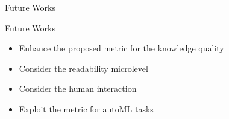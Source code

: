 \documentclass{beamer}
\begin{document}
\begin{frame}[c]{Future Works}
	\vfill
	\begin{block}{Future Works}
		\medskip
		\begin{itemize}
			\item Enhance the proposed metric for the knowledge quality
			\medskip
			\item Consider the readability microlevel
			\medskip
			\item Consider the human interaction
			\medskip
			\item Exploit the metric for autoML tasks
		\end{itemize}
		\medskip
	\end{block}
	\vfill
\end{frame}

\section*{}

\frame{\titlepage}

\section*{\refname}

\begin{frame}{\refname}
	\scriptsize
	
	
\end{frame}
\end{document}
